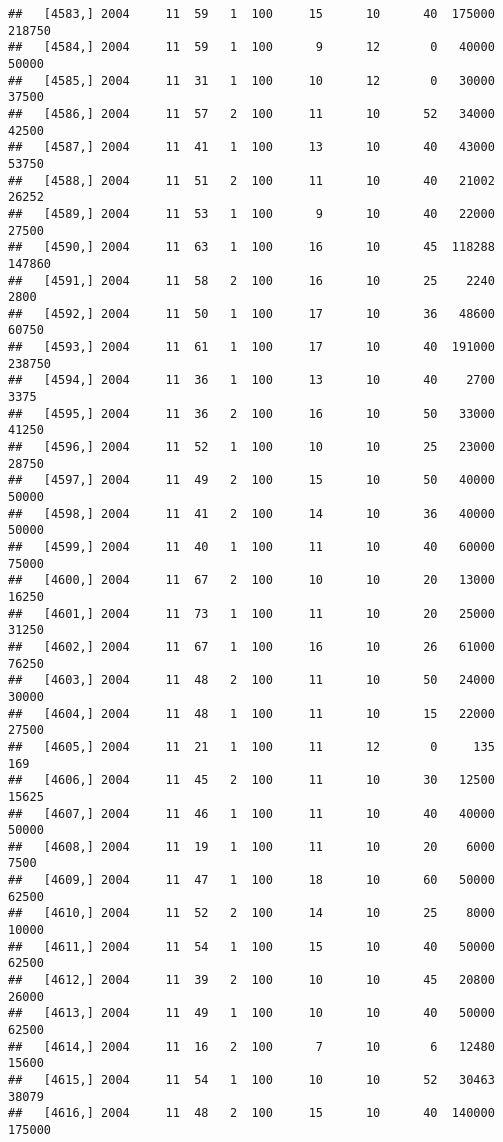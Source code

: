 \documentclass{article}\usepackage[]{graphicx}\usepackage[]{color}
\makeatletter
\newenvironment{kframe}{%
 \def\at@end@of@kframe{}%
 \ifinner\ifhmode%
  \def\at@end@of@kframe{\end{minipage}}%
  \begin{minipage}{\columnwidth}%
 \fi\fi%
 \def\FrameCommand##1{\hskip\@totalleftmargin \hskip-\fboxsep
 \colorbox{shadecolor}{##1}\hskip-\fboxsep
     \hskip-\linewidth \hskip-\@totalleftmargin \hskip\columnwidth}%
 \MakeFramed {\advance\hsize-\width
   \@totalleftmargin\z@ \linewidth\hsize
   \@setminipage}}%
 {\par\unskip\endMakeFramed%
 \at@end@of@kframe}
\newenvironment{knitrout}{}{} %
\makeatother
\begin{document}
\begin{knitrout}
\begin{kframe}
\begin{verbatim}
##   [4583,] 2004     11  59   1  100     15      10      40  175000  218750
##   [4584,] 2004     11  59   1  100      9      12       0   40000   50000
##   [4585,] 2004     11  31   1  100     10      12       0   30000   37500
##   [4586,] 2004     11  57   2  100     11      10      52   34000   42500
##   [4587,] 2004     11  41   1  100     13      10      40   43000   53750
##   [4588,] 2004     11  51   2  100     11      10      40   21002   26252
##   [4589,] 2004     11  53   1  100      9      10      40   22000   27500
##   [4590,] 2004     11  63   1  100     16      10      45  118288  147860
##   [4591,] 2004     11  58   2  100     16      10      25    2240    2800
##   [4592,] 2004     11  50   1  100     17      10      36   48600   60750
##   [4593,] 2004     11  61   1  100     17      10      40  191000  238750
##   [4594,] 2004     11  36   1  100     13      10      40    2700    3375
##   [4595,] 2004     11  36   2  100     16      10      50   33000   41250
##   [4596,] 2004     11  52   1  100     10      10      25   23000   28750
##   [4597,] 2004     11  49   2  100     15      10      50   40000   50000
##   [4598,] 2004     11  41   2  100     14      10      36   40000   50000
##   [4599,] 2004     11  40   1  100     11      10      40   60000   75000
##   [4600,] 2004     11  67   2  100     10      10      20   13000   16250
##   [4601,] 2004     11  73   1  100     11      10      20   25000   31250
##   [4602,] 2004     11  67   1  100     16      10      26   61000   76250
##   [4603,] 2004     11  48   2  100     11      10      50   24000   30000
##   [4604,] 2004     11  48   1  100     11      10      15   22000   27500
##   [4605,] 2004     11  21   1  100     11      12       0     135     169
##   [4606,] 2004     11  45   2  100     11      10      30   12500   15625
##   [4607,] 2004     11  46   1  100     11      10      40   40000   50000
##   [4608,] 2004     11  19   1  100     11      10      20    6000    7500
##   [4609,] 2004     11  47   1  100     18      10      60   50000   62500
##   [4610,] 2004     11  52   2  100     14      10      25    8000   10000
##   [4611,] 2004     11  54   1  100     15      10      40   50000   62500
##   [4612,] 2004     11  39   2  100     10      10      45   20800   26000
##   [4613,] 2004     11  49   1  100     10      10      40   50000   62500
##   [4614,] 2004     11  16   2  100      7      10       6   12480   15600
##   [4615,] 2004     11  54   1  100     10      10      52   30463   38079
##   [4616,] 2004     11  48   2  100     15      10      40  140000  175000

\end{verbatim}
\end{kframe}
\end{knitrout}
\end{document}

